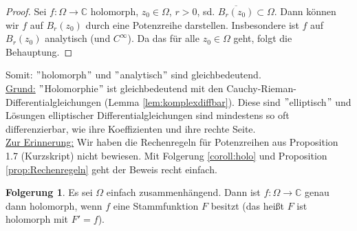 \documentclass[11pt,titlepage]{article}
\theoremstyle{definition}
\newtheorem{corollary}[theorem]{Folgerung}
\theoremstyle{remark}
\begin{document}
	\begin{proof}
		Sei $f:\Omega\to\mathbb{C}$ holomorph, $z_0 \in\Omega$, $r>0$, sd. $\overline{B_r (z_0)}
		\subset\Omega$. Dann können wir $f$ auf $B_r (z_0)$ durch eine Potenzreihe darstellen.
		Insbesondere ist $f$ auf $B_r (z_0)$ analytisch (und $C^{\infty}$). 
		Da das für alle $z_0 \in\Omega$ geht, folgt die Behauptung.
	\end{proof}
	
	Somit: $"$holomorph$"$ und $"$analytisch$"$ sind gleichbedeutend. \\
	\underline{Grund:} $"$Holomorphie$"$ ist gleichbedeutend mit den 
	Cauchy-Rieman-Differentialgleichungen (Lemma \ref{lem:komplexdiffbar}). 
	Diese sind $"$elliptisch$"$ und Lösungen 
	elliptischer Differentialgleichungen sind mindestens so oft differenzierbar, wie ihre 
	Koeffizienten und ihre rechte Seite.\\
	\underline{Zur Erinnerung:} Wir haben die Rechenregeln für Potenzreihen aus Proposition 1.7 
	(Kurzskript)	
	nicht bewiesen. Mit Folgerung \ref{coroll:holo} und Proposition \ref{prop:Rechenregeln} geht der 
	Beweis recht einfach.
	
	\begin{corollary}\label{coroll:stammfkt}
		Es sei $\Omega$ einfach zusammenhängend. Dann ist $f:\Omega\to\mathbb{C}$ genau dann 
		holomorph, wenn $f$ eine Stammfunktion $F$ besitzt (das heißt $F$ ist holomorph mit 
		$F'=f$).
	\end{corollary}
	
\end{document}
